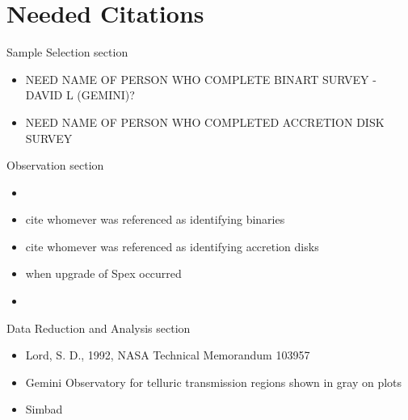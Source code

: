 \section{Needed Citations}

\begin{bf}Sample Selection section\end{bf}
	\begin{itemize}
		\item{} NEED NAME OF PERSON WHO COMPLETE BINART SURVEY - DAVID L (GEMINI)?
		\item{} NEED NAME OF PERSON WHO COMPLETED ACCRETION DISK SURVEY
\end{itemize}

\begin{bf}Observation section\end{bf}
	\begin{itemize}
		\item{} \cite{Rayner_2003}
		\item{} cite whomever was referenced as identifying binaries \cite{Adam_Krauss_or_other_paper}
		\item{} cite whomever was referenced as identifying accretion disks \cite{disk_guy}
		\item{} when upgrade of Spex occurred \cite{Spex}\\
		\item{} \cite{2mass_catalog_for_j_mags}
	\end{itemize} 


\begin{bf}Data Reduction and Analysis section\end{bf}
	\begin{itemize}
		\item{} Lord, S. D., 1992, NASA Technical Memorandum 103957
		\item{} Gemini Observatory for telluric transmission regions shown in gray on plots
  		\item{} Simbad
  
	\end{itemize}